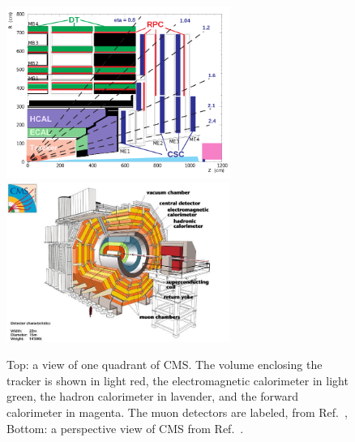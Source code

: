 \begin{figure}[h!]
  \begin{center}
      \includegraphics[width=0.65\textwidth, trim = 2cm 0 0 0]{figures/cmsQuad.png}\\
      \includegraphics[width=0.65\textwidth,]{figures/CMS_Detector.jpg}
      \caption{\label{fig:cms} Top: a view of one quadrant of CMS. The volume enclosing 
      the tracker is shown in light red, the electromagnetic calorimeter in light green, 
      the hadron calorimeter in lavender, and the forward calorimeter in magenta. 
      The muon detectors are labeled, from Ref.~\cite{2012JInst...7P0002T},
      Bottom: a perspective view of CMS from Ref.~\cite{1748-0221-3-08-S08004}.}
  \end{center}
\end{figure}

